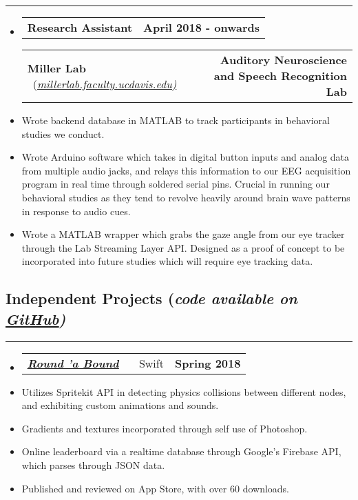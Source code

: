 \documentclass[10pt,letterpaper]{article}
\makeatletter
\newcommand{\header}[2]
{
	\begin{tabular*}{\linewidth}{l @{\extracolsep{\fill}} r}
		#1 & #2 \\
	\end{tabular*}
}
\newcommand{\sectionbreak}
{
	\vspace{-1.2em}
	\rule{\textwidth}{1.7pt}
	\vspace{-1.7em}
}
\makeatother
\begin{document}
\hrule

\begin{itemize}
	\item[]
		\header
			{\textbf{Research Assistant}} 
			{\textbf{April 2018 - onwards}}
		\header
		{\textbf{Miller Lab} \ (\href{https://millerlab.faculty.ucdavis.edu}{\small \emph{\underline{millerlab.faculty.ucdavis.edu})} } }
			{\textbf{Auditory Neuroscience and Speech Recognition Lab}} 
		\item
			Wrote backend database in MATLAB to track participants in behavioral studies we conduct.
		\item
			Wrote Arduino software which takes in digital button inputs and analog data from multiple audio jacks, and relays this information to our EEG acquisition program in real time through soldered serial pins. Crucial in running our behavioral studies as they tend to revolve heavily around brain wave patterns in response to audio cues.
		\item 
			Wrote a MATLAB wrapper which grabs the gaze angle from our eye tracker through the Lab Streaming Layer API. Designed as a proof of concept to be incorporated into future studies which will require eye tracking data.
\end{itemize}

\vspace{-1.5em}

\subsection*{Independent Projects (\emph{code available on \emph{\href{https://github.com/aashpointo}{\emph{\underline{GitHub}}}})}}
\sectionbreak

	

\begin{itemize}
	\item[]
		\header 
		{
			\href{https://itunes.apple.com/us/app/round-bound/id1369632746?mt=8}{\emph{\underline{\textbf{Round 'a Bound}}}} \ \ \ \footnotesize Swift
		}
			{\textbf{Spring 2018}}
		\item 
			Utilizes Spritekit API in detecting physics collisions between different nodes, and exhibiting custom animations and sounds.
		\item
			Gradients and textures incorporated through self use of Photoshop.
		\item
			Online leaderboard via a realtime database through Google's Firebase API, which parses through JSON data. 
		\item
			Published and reviewed on App Store, with over 60 downloads. 
\end{itemize}
\end{document}
